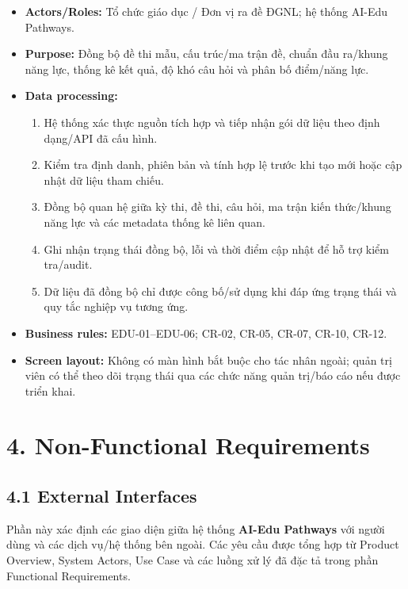 \documentclass[12pt,a4paper,oneside]{report}
\begin{document}
\begin{itemize}
    \item \textbf{Actors/Roles:} Tổ chức giáo dục / Đơn vị ra đề ĐGNL; hệ thống AI-Edu Pathways.
    \item \textbf{Purpose:} Đồng bộ đề thi mẫu, cấu trúc/ma trận đề, chuẩn đầu ra/khung năng lực, thống kê kết quả, độ khó câu hỏi và phân bố điểm/năng lực.
    \item \textbf{Data processing:}
    \begin{enumerate}
        \item Hệ thống xác thực nguồn tích hợp và tiếp nhận gói dữ liệu theo định dạng/API đã cấu hình.
        \item Kiểm tra định danh, phiên bản và tính hợp lệ trước khi tạo mới hoặc cập nhật dữ liệu tham chiếu.
        \item Đồng bộ quan hệ giữa kỳ thi, đề thi, câu hỏi, ma trận kiến thức/khung năng lực và các metadata thống kê liên quan.
        \item Ghi nhận trạng thái đồng bộ, lỗi và thời điểm cập nhật để hỗ trợ kiểm tra/audit.
        \item Dữ liệu đã đồng bộ chỉ được công bố/sử dụng khi đáp ứng trạng thái và quy tắc nghiệp vụ tương ứng.
    \end{enumerate}
    \item \textbf{Business rules:} EDU-01--EDU-06; CR-02, CR-05, CR-07, CR-10, CR-12.
    \item \textbf{Screen layout:} Không có màn hình bắt buộc cho tác nhân ngoài; quản trị viên có thể theo dõi trạng thái qua các chức năng quản trị/báo cáo nếu được triển khai.
\end{itemize}

\section*{4. Non-Functional Requirements}

\subsection*{4.1 External Interfaces}

Phần này xác định các giao diện giữa hệ thống \textbf{AI-Edu Pathways} với người dùng và các dịch vụ/hệ thống bên ngoài. Các yêu cầu được tổng hợp từ Product Overview, System Actors, Use Case và các luồng xử lý đã đặc tả trong phần Functional Requirements.
\end{document}
